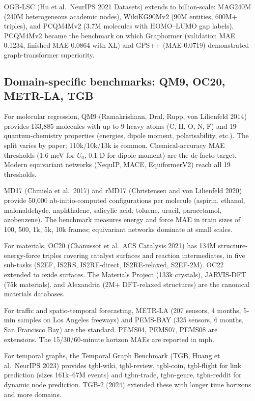 \documentclass{article}
\begin{document}
OGB-LSC (Hu et al.~NeurIPS 2021 Datasets) extends to billion-scale: MAG240M (240M heterogeneous academic nodes), WikiKG90Mv2 (90M entities, 600M+ triples), and PCQM4Mv2 (3.7M molecules with HOMO--LUMO gap labels). PCQM4Mv2 became the benchmark on which Graphormer (validation MAE 0.1234, finished MAE 0.0864 with XL) and GPS++ (MAE 0.0719) demonstrated graph-transformer superiority.

\subsection{Domain-specific benchmarks: QM9, OC20, METR-LA, TGB}\label{domain-specific-benchmarks-qm9-oc20-metr-la-tgb}

For molecular regression, QM9 (Ramakrishnan, Dral, Rupp, von Lilienfeld 2014) provides 133,885 molecules with up to 9 heavy atoms (C, H, O, N, F) and 19 quantum-chemistry properties (energies, dipole moment, polarisability, etc.). The split varies by paper; 110k/10k/13k is common. Chemical-accuracy MAE thresholds (1.6 meV for \(U_0\), 0.1 D for dipole moment) are the de facto target. Modern equivariant networks (NequIP, MACE, EquiformerV2) reach all 19 thresholds.

MD17 (Chmiela et al.~2017) and rMD17 (Christensen and von Lilienfeld 2020) provide 50,000 ab-initio-computed configurations per molecule (aspirin, ethanol, malonaldehyde, naphthalene, salicylic acid, toluene, uracil, paracetamol, azobenzene). The benchmark measures energy and force MAE in train sizes of 100, 500, 1k, 5k, 10k frames; equivariant networks dominate at small scales.

For materials, OC20 (Chanussot et al.~ACS Catalysis 2021) has 134M structure-energy-force triples covering catalyst surfaces and reaction intermediates, in five sub-tasks (S2EF, IS2RS, IS2RE-direct, IS2RE-relaxed, S2EF-2M). OC22 extended to oxide surfaces. The Materials Project (133k crystals), JARVIS-DFT (75k materials), and Alexandria (2M+ DFT-relaxed structures) are the canonical materials databases.

For traffic and spatio-temporal forecasting, METR-LA (207 sensors, 4 months, 5-min samples on Los Angeles freeways) and PEMS-BAY (325 sensors, 6 months, San Francisco Bay) are the standard. PEMS04, PEMS07, PEMS08 are extensions. The 15/30/60-minute horizon MAEs are reported in mph.

For temporal graphs, the Temporal Graph Benchmark (TGB, Huang et al.~NeurIPS 2023) provides tgbl-wiki, tgbl-review, tgbl-coin, tgbl-flight for link prediction (sizes 161k--67M events) and tgbn-trade, tgbn-genre, tgbn-reddit for dynamic node prediction. TGB-2 (2024) extended these with longer time horizons and more domains.
\end{document}
